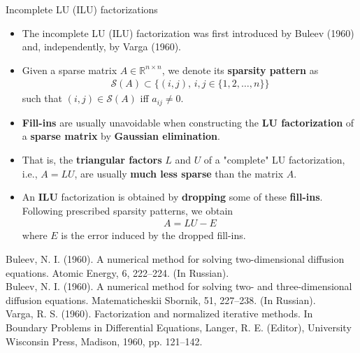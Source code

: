 \documentclass[t,usepdftitle=false]{beamer}
\begin{document}
\begin{frame}{Incomplete LU (ILU) factorizations}
\begin{itemize}
\item The incomplete LU (ILU) factorization was first introduced by Buleev (1960) and, independently, by Varga (1960).
\item Given a sparse matrix $A\in\mathbb{R}^{n\times n}$, we denote its \textbf{sparsity pattern} as
\begin{align*}
\mathcal{S}(A)\subset\{(i,j),\,i,j\in\{1,2,\dots,n\}\}
\end{align*}
such that $(i,j)\in\mathcal{S}(A)$ iff $a_{ij}\neq 0$.
\item \textbf{Fill-ins} are usually unavoidable when constructing the \textbf{LU factorization} of a \textbf{sparse matrix} by \textbf{Gaussian elimination}.
\item[] That is, the \textbf{triangular factors} $L$ and $U$ of a "complete" LU factorization, i.e., $A=LU$, are usually \textbf{much less sparse} than the matrix $A$.
\item An \textbf{ILU} factorization is obtained by \textbf{dropping} some of these \textbf{fill-ins}.
Following prescribed sparsity patterns, we obtain
\begin{align*}
A=LU-E
\end{align*}
where $E$ is the error induced by the dropped fill-ins.
\end{itemize}\smallskip
\tiny{Buleev, N. I. (1960). A numerical method for solving two-dimensional diffusion equations. Atomic Energy, 6, 222–224. (In Russian).}\tinyskip\\
\tiny{Buleev, N. I. (1960). A numerical method for solving two- and three-dimensional diffusion equations. Matematicheskii Sbornik, 51, 227–238. (In Russian).}\tinyskip\\
\tiny{Varga, R. S. (1960). Factorization and normalized iterative methods. In Boundary Problems in Differential
Equations, Langer, R. E. (Editor), University Wisconsin Press, Madison, 1960, pp. 121–142.}
\end{frame}
\end{document}
